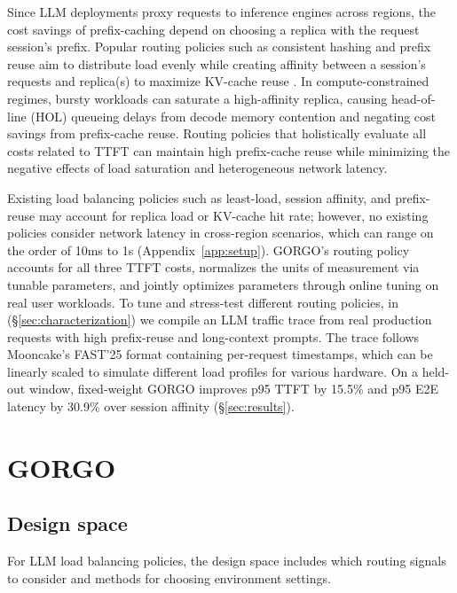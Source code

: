 \documentclass{article}
\begin{document}
Since LLM deployments proxy requests to inference engines across regions, the cost savings of prefix-caching depend on choosing a replica with the request session's prefix. Popular routing policies such as consistent hashing and prefix reuse aim to distribute load evenly while creating affinity between a session's requests and replica(s) to maximize KV-cache reuse \citep{karger1997consistent, chord2003, sglang2024, skywalker}. In compute-constrained regimes, bursty workloads can saturate a high-affinity replica, causing head-of-line (HOL) queueing delays from decode memory contention and negating cost savings from prefix-cache reuse. Routing policies that holistically evaluate all costs related to TTFT can maintain high prefix-cache reuse while minimizing the negative effects of load saturation and heterogeneous network latency.

Existing load balancing policies such as least-load, session affinity, and prefix-reuse may account for replica load or KV-cache hit rate; however, no existing policies consider network latency in cross-region scenarios, which can range on the order of 10ms to 1s (Appendix~\ref{app:setup}). GORGO's routing policy accounts for all three TTFT costs, normalizes the units of measurement via tunable parameters, and jointly optimizes parameters through online tuning on real user workloads. To tune and stress-test different routing policies, in (\S\ref{sec:characterization}) we compile an LLM traffic trace from real production requests with high prefix-reuse and long-context prompts. The trace follows Mooncake's FAST'25 format \citep{qin2024mooncake} containing per-request timestamps, which can be linearly scaled to simulate different load profiles for various hardware. On a held-out window, fixed-weight GORGO improves p95 TTFT by 15.5\% and p95 E2E latency by 30.9\% over session affinity (\S\ref{sec:results}).

\section{GORGO}
\label{sec:method}

\subsection{Design space}

For LLM load balancing policies, the design space includes which routing signals to consider and methods for choosing environment settings.
\end{document}
